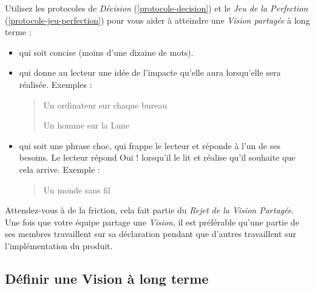 \documentclass[paper=6in:9in,pagesize=pdftex,headinclude=on,footinclude=on,12pt]{scrbook}
\newcommand*{\numref}[1]{{\hyperref[{#1}]{\autoref*{#1}}}}
\begin{document}
Utilisez les protocoles de \emph{Décision} (\numref{protocole-decision}) et le \emph{Jeu de la Perfection} (\numref{protocole-jeu-perfection})
pour vous aider à atteindre une \emph{Vision partagée} à long terme :
\begin{itemize}
	\item qui soit concise (moins d'une dizaine de mots).
	\item qui donne au lecteur une idée de l'impacte qu'elle aura lorsqu'elle sera réalisée. Exemples :
		  \begin{quote}
		  	\og{}Un ordinateur sur chaque bureau\fg{}

		  	\og{}Un homme sur la Lune\fg{}
		  \end{quote}
	\item qui soit une phrase \og{}choc\fg{}, qui frappe le lecteur et réponde à l'un de ses besoins. Le lecteur répond \og{}Oui !\fg{}
	      lorsqu'il le lit et réalise qu'il souhaite que cela arrive. Exemple :
	      \begin{quote}
	      	\og{}Un monde sans fil\fg{}
	      \end{quote}
\end{itemize}

Attendez-vous à de la friction, cela fait partie du \emph{Rejet de la Vision Partagée}. Une fois que votre équipe partage une
\emph{Vision}, il est préférable qu'une partie de ses membres travaillent sur sa déclaration pendant que d'autres travaillent sur
l'implémentation du produit.

\subsection{Définir une Vision à long terme}
\end{document}
